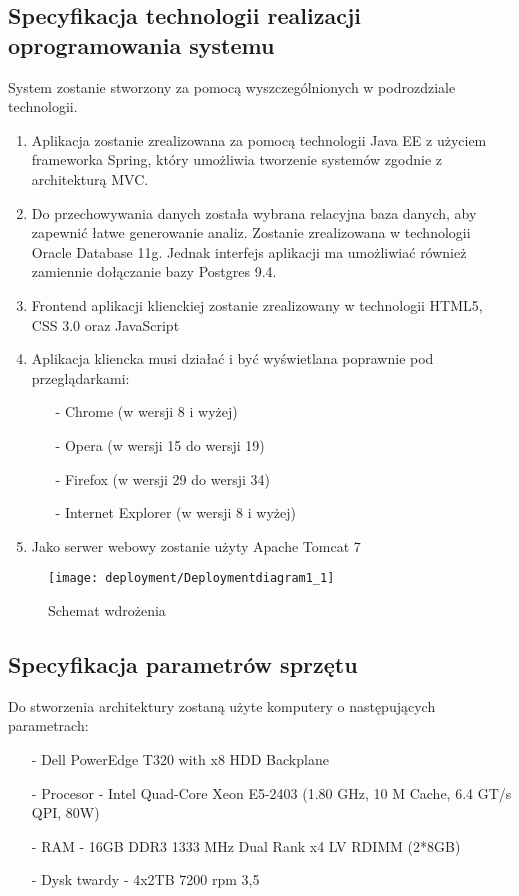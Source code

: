 \subsection{Specyfikacja technologii realizacji oprogramowania systemu}
System zostanie stworzony za pomocą wyszczególnionych w podrozdziale technologii.
\begin{enumerate}
	\item Aplikacja zostanie zrealizowana za pomocą technologii Java EE z użyciem frameworka Spring, który umożliwia tworzenie systemów zgodnie z architekturą MVC.
	\item Do przechowywania danych została wybrana relacyjna baza danych, aby zapewnić łatwe generowanie analiz. Zostanie zrealizowana w technologii Oracle Database 11g. Jednak interfejs aplikacji ma umożliwiać również zamiennie dołączanie bazy Postgres 9.4.
	\item Frontend aplikacji klienckiej zostanie zrealizowany w technologii HTML5, CSS 3.0 oraz JavaScript
	\item Aplikacja kliencka musi działać i być wyświetlana poprawnie pod przeglądarkami:
	\begin{itemize}
	 \item[-] Chrome (w wersji 8 i wyżej)
	 \item[-] Opera (w wersji 15 do wersji 19)
	 \item[-] Firefox (w wersji 29 do wersji 34)
	 \item[-] Internet Explorer (w wersji 8 i wyżej)
	 \end{itemize}
	\item Jako serwer webowy zostanie użyty Apache Tomcat 7
\end{enumerate}

\begin{figure}[H]
    \centering
	\texttt{[image: deployment/Deploymentdiagram1\_1]}
    \caption{Schemat wdrożenia}
    \label{fig:Deploymentdiagram1}
\end{figure}

\subsection{Specyfikacja parametrów sprzętu}
Do stworzenia architektury zostaną użyte komputery o następujących parametrach:
\begin{itemize}
\item[-] Dell PowerEdge T320 with x8 HDD Backplane 
\item[-] Procesor - Intel Quad-Core Xeon E5-2403 (1.80 GHz, 10 M Cache, 6.4 GT/s QPI, 80W)
\item[-] RAM - 16GB DDR3 1333 MHz Dual Rank x4 LV RDIMM (2*8GB)
\item[-] Dysk twardy - 4x2TB 7200 rpm 3,5
\end{itemize}